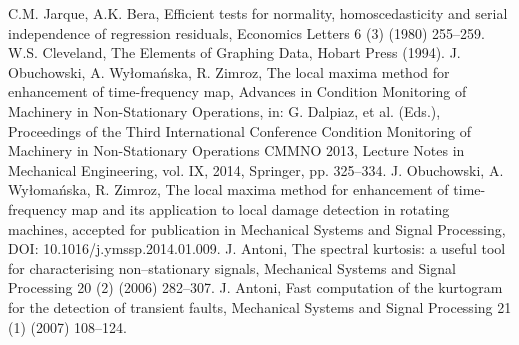 \documentclass[3p,times]{elsarticle}
\begin{document}
\begin{thebibliography}{00}
 C.M. Jarque, A.K. Bera, Efficient tests for normality, homoscedasticity and serial independence of regression residuals, Economics Letters 6 (3) (1980) 255--259. 
 W.S. Cleveland, The Elements of Graphing Data, Hobart Press (1994).
 J. Obuchowski, A. Wy{\l}oma{\'n}ska, R. Zimroz, The local maxima method for enhancement of time-frequency map, Advances in Condition Monitoring of Machinery in Non-Stationary Operations, in: G. Dalpiaz, et al. (Eds.), Proceedings of the Third International Conference Condition Monitoring of Machinery in Non-Stationary Operations CMMNO 2013, Lecture Notes in Mechanical Engineering, vol. IX, 2014, Springer, pp. 325–334.
 J. Obuchowski, A. Wy{\l}oma{\'n}ska, R. Zimroz, The local maxima method for enhancement of time-frequency map and its application to local damage detection in rotating machines, accepted for publication in Mechanical Systems and Signal Processing, DOI: 10.1016/j.ymssp.2014.01.009.
 J. Antoni, The spectral kurtosis: a useful tool for characterising non--stationary signals, Mechanical Systems and Signal Processing 20 (2) (2006) 282--307.
 J. Antoni, Fast computation of the kurtogram for the detection of transient faults, Mechanical Systems and Signal Processing 21 (1) (2007) 108--124.
\end{thebibliography}

 
\end{document}
